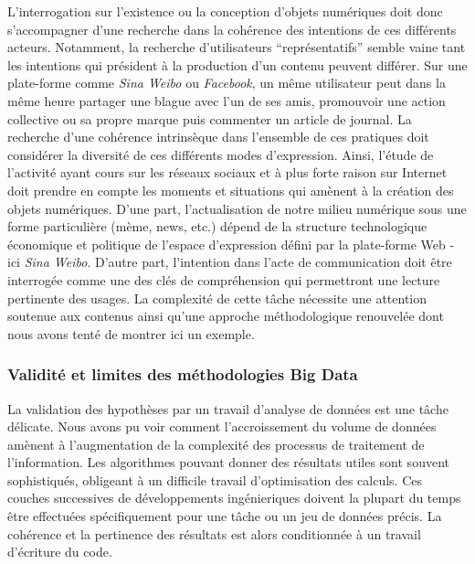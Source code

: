 L'interrogation sur l'existence ou la conception d'objets numériques doit donc s'accompagner d'une recherche dans la cohérence des intentions de ces différents acteurs. Notamment, la recherche d'utilisateurs ``représentatifs'' semble vaine tant les intentions qui président à la production d'un contenu peuvent différer. Sur une plate-forme comme \textit{Sina Weibo} ou \textit{Facebook}, un même utilisateur peut dans la même heure partager une blague avec l'un de ses amis, promouvoir une action collective ou sa propre marque puis commenter un article de journal. La recherche d'une cohérence intrinsèque dans l'ensemble de ces pratiques doit considérer la diversité de ces différents modes d'expression. Ainsi, l'étude de l'activité ayant cours sur les réseaux sociaux et à plus forte raison sur Internet doit prendre en compte les moments et situations qui amènent à la création des objets numériques. D'une part, l'actualisation de notre milieu numérique sous une forme particulière (mème, news, etc.) dépend de la structure technologique économique et politique de l'espace d'expression défini par la plate-forme Web - ici \textit{Sina Weibo}. D'autre part, l'intention dans l'acte de communication doit être interrogée comme une des clés de compréhension qui permettront une lecture pertinente des usages. La complexité de cette tâche nécessite une attention soutenue aux contenus ainsi qu'une approche méthodologique renouvelée dont nous avons tenté de montrer ici un exemple.


\subsubsection[Validité et limites des méthodologies Big Data]{Validité et limites des méthodologies Big Data}


La validation des hypothèses par un travail d'analyse de données est une tâche délicate. Nous avons pu voir comment l'accroissement du volume de données amènent à l'augmentation de la complexité des processus de traitement de l'information. Les algorithmes pouvant donner des résultats utiles sont souvent sophistiqués, obligeant à un difficile travail d'optimisation des calculs. Ces couches successives de développements ingénieriques doivent la plupart du temps être effectuées spécifiquement pour une tâche ou un jeu de données précis. La cohérence et la pertinence des résultats est alors conditionnée à un travail d'écriture du code. 

